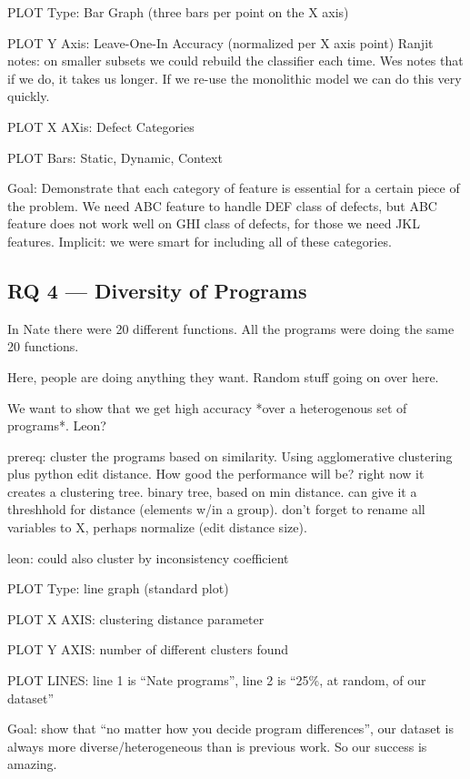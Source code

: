 \documentclass[conference]{IEEEtran}
\begin{document}
PLOT Type: Bar Graph (three bars per point on the X axis)

PLOT Y Axis: Leave-One-In Accuracy (normalized per X axis point)
Ranjit notes: on smaller subsets we could rebuild the classifier each time.
Wes notes that if we do, it takes us longer. If we re-use the monolithic
model we can do this very quickly.

PLOT X AXis: Defect Categories

PLOT Bars: Static, Dynamic, Context

Goal: Demonstrate that each category of feature is essential for a certain
piece of the problem. We need ABC feature to handle DEF class of defects,
but ABC feature does not work well on GHI class of defects, for those we
need JKL features. Implicit: we were smart for including all of these
categories.

\subsection{RQ 4 --- Diversity of Programs}

In Nate there were 20 different functions. All the programs were doing the
same 20 functions.

Here, people are doing anything they want. Random stuff going on over here.

We want to show that we get high accuracy *over a heterogenous set of
programs*. Leon?

prereq: cluster the programs based on similarity. Using agglomerative
clustering plus python edit distance. How good the performance will be?
right now it creates a clustering tree. binary tree, based on min distance.
can give it a threshhold for distance (elements w/in a group). don't forget
to rename all variables to X, perhaps normalize (edit distance size).

leon: could also cluster by inconsistency coefficient

PLOT Type: line graph (standard plot)

PLOT X AXIS: clustering distance parameter

PLOT Y AXIS: number of different clusters found

PLOT LINES: line 1 is ``Nate programs'', line 2 is ``25\%, at random, of our dataset''

Goal: show that ``no matter how you decide program differences'', our
dataset is always more diverse/heterogeneous than is previous work. So our
success is amazing.
\end{document}
